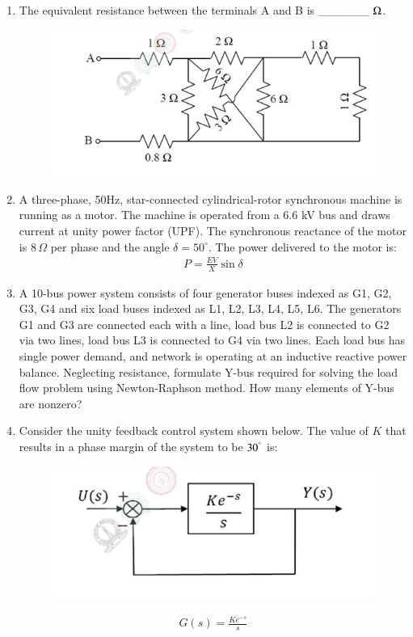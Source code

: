 \documentclass[journal,12pt,onecolumn]{IEEEtran}
\theoremstyle{remark}
\begin{document}
\begin{enumerate}
\item The equivalent resistance between the terminals A and B is ______ $\ohm$.  

\begin{figure}[h!]
    \centering
    \includegraphics[width=0.5\columnwidth]{figs/19.png}
    \caption{}
    \label{fig:placeholder}
\end{figure}



\item A three-phase, 50Hz, star-connected cylindrical-rotor synchronous machine is running as a motor. 
The machine is operated from a 6.6 kV bus and draws current at unity power factor (UPF). The synchronous reactance of the motor is $8 \, \Omega$ per phase and the angle $\delta = 50^\circ$. 
The power delivered to the motor is:  
\begin{align*}
    P = \frac{EV}{X} \sin \delta
\end{align*}

\item A 10-bus power system consists of four generator buses indexed as G1, G2, G3, G4 and six load buses indexed as L1, L2, L3, L4, L5, L6. The generators G1 and G3 are connected each with a line, load bus L2 is connected to G2 via two lines, load bus L3 is connected to G4 via two lines. Each load bus has single power demand, and network is operating at an inductive reactive power balance.  
Neglecting resistance, formulate Y-bus required for solving the load flow problem using Newton-Raphson method. How many elements of Y-bus are nonzero?

\item Consider the unity feedback control system shown below. The value of $K$ that results in a phase margin of the system to be $30^\degree$ is:  
\begin{figure}[H]
    \centering
    \includegraphics[width=0.5\columnwidth]{figs/22.png}
    \caption{}
    \label{fig:placeholder}
\end{figure}
\begin{align*}
    G(s) = \frac{Ke^{-s}}{s}
\end{align*}


\end{enumerate}
\end{document}
